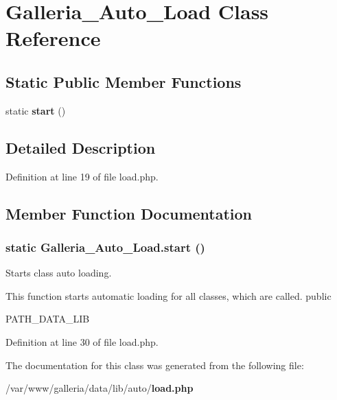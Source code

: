 \section{Galleria\_\-Auto\_\-Load Class Reference}
\label{classGalleria__Auto__Load}
\subsection*{Static Public Member Functions}
\begin{CompactItemize}
\item 
static {\bf start} ()
\end{CompactItemize}


\subsection{Detailed Description}


Definition at line 19 of file load.php.

\subsection{Member Function Documentation}
\subsubsection{\setlength{\rightskip}{0pt plus 5cm}static Galleria\_\-Auto\_\-Load.start ()\hspace{0.3cm}{\tt  [static]}}\label{classGalleria__Auto__Load_c9a41fca73c9f93f8b59bc6313dee4b8}


Starts class auto loading.

This function starts automatic loading for all classes, which are called.  public

PATH\_\-DATA\_\-LIB 

Definition at line 30 of file load.php.

The documentation for this class was generated from the following file:\begin{CompactItemize}
\item 
/var/www/galleria/data/lib/auto/{\bf load.php}\end{CompactItemize}
